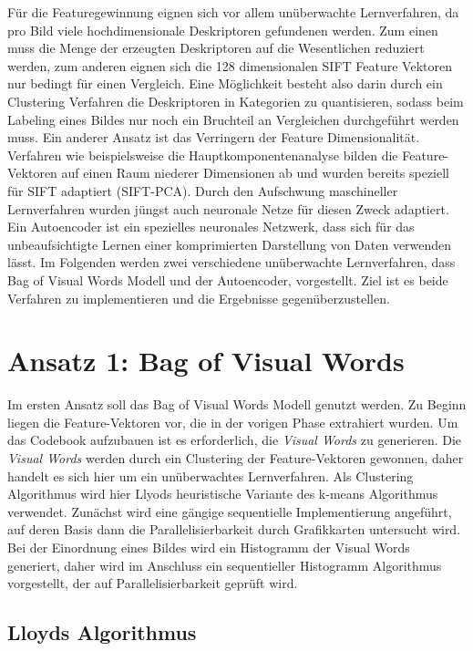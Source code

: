 Für die Featuregewinnung eignen sich vor allem unüberwachte Lernverfahren, da pro Bild viele hochdimensionale Deskriptoren gefundenen werden. Zum einen muss die Menge der erzeugten Deskriptoren auf die Wesentlichen reduziert werden, zum anderen eignen sich die 128 dimensionalen SIFT Feature Vektoren nur bedingt für einen Vergleich. Eine Möglichkeit besteht also darin durch ein Clustering Verfahren die Deskriptoren in Kategorien zu quantisieren, sodass beim Labeling eines Bildes nur noch ein Bruchteil an Vergleichen durchgeführt werden muss. Ein anderer Ansatz ist das Verringern der Feature Dimensionalität. Verfahren wie beispielsweise die Hauptkomponentenanalyse bilden die Feature-Vektoren auf einen Raum niederer Dimensionen ab und wurden bereits speziell für SIFT adaptiert (SIFT-PCA). Durch den Aufschwung maschineller Lernverfahren wurden jüngst auch neuronale Netze für diesen Zweck adaptiert. Ein Autoencoder ist ein spezielles neuronales Netzwerk, dass sich für das unbeaufsichtigte Lernen einer komprimierten Darstellung von Daten verwenden lässt. Im Folgenden werden zwei verschiedene unüberwachte Lernverfahren, dass Bag of Visual Words Modell und der Autoencoder, vorgestellt. Ziel ist es beide Verfahren zu implementieren und die Ergebnisse gegenüberzustellen.

\section{Ansatz 1: Bag of Visual Words}

Im ersten Ansatz soll das Bag of Visual Words Modell genutzt werden. Zu Beginn liegen die Feature-Vektoren vor, die in der vorigen Phase extrahiert wurden. Um das Codebook aufzubauen ist es erforderlich, die \textit{Visual Words} zu generieren. Die \textit{Visual Words} werden durch ein Clustering der Feature-Vektoren gewonnen, daher handelt es sich hier um ein unüberwachtes Lernverfahren. Als Clustering Algorithmus wird hier Llyods heuristische Variante des k-means Algorithmus verwendet. Zunächst wird eine gängige sequentielle Implementierung angeführt, auf deren Basis dann die Parallelisierbarkeit durch Grafikkarten untersucht wird. Bei der Einordnung eines Bildes wird ein Histogramm der Visual Words generiert, daher wird im Anschluss ein sequentieller Histogramm Algorithmus vorgestellt, der auf Parallelisierbarkeit geprüft wird.

\subsection{Lloyds Algorithmus}

